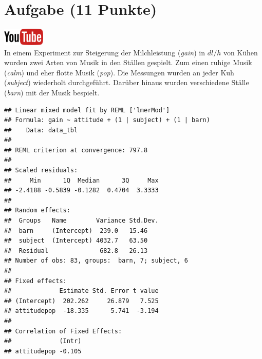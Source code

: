 \documentclass[a4paper, 10pt]{scrartcl}\usepackage[]{graphicx}\usepackage[]{xcolor}
\makeatletter
\newenvironment{kframe}{%
 \def\at@end@of@kframe{}%
 \ifinner\ifhmode%
  \def\at@end@of@kframe{\end{minipage}}%
  \begin{minipage}{\columnwidth}%
 \fi\fi%
 \def\FrameCommand##1{\hskip\@totalleftmargin \hskip-\fboxsep
 \colorbox{shadecolor}{##1}\hskip-\fboxsep
     \hskip-\linewidth \hskip-\@totalleftmargin \hskip\columnwidth}%
 \MakeFramed {\advance\hsize-\width
   \@totalleftmargin\z@ \linewidth\hsize
   \@setminipage}}%
 {\par\unskip\endMakeFramed%
 \at@end@of@kframe}
\newenvironment{knitrout}{}{} %
\makeatother
\begin{document}
\clearpage

\section{Aufgabe \hfill (11 Punkte)}

\hfill\href{https://youtu.be/ysai7umvPoA}{\includegraphics[width =
  2cm]{img/youtube}}\\[1Ex]


In einem Experiment zur Steigerung der Milchleistung (\textit{gain}) in $dl/h$ von
K{\"u}hen wurden zwei Arten von Musik in den St{\"a}llen gespielt. Zum einen ruhige
Musik (\textit{calm}) und eher flotte Musik (\textit{pop}). Die Messungen
wurden an jeder Kuh (\textit{subject}) wiederholt durchgef{\"u}hrt. Dar{\"u}ber
hinaus wurden verschiedene St{\"a}lle (\textit{barn}) mit der Musik bespielt.

\begin{knitrout}
\color{fgcolor}\begin{kframe}
\begin{verbatim}
## Linear mixed model fit by REML ['lmerMod']
## Formula: gain ~ attitude + (1 | subject) + (1 | barn)
##    Data: data_tbl
## 
## REML criterion at convergence: 797.8
## 
## Scaled residuals: 
##     Min      1Q  Median      3Q     Max 
## -2.4188 -0.5839 -0.1282  0.4704  3.3333 
## 
## Random effects:
##  Groups   Name        Variance Std.Dev.
##  barn     (Intercept)  239.0   15.46   
##  subject  (Intercept) 4032.7   63.50   
##  Residual              682.8   26.13   
## Number of obs: 83, groups:  barn, 7; subject, 6
## 
## Fixed effects:
##             Estimate Std. Error t value
## (Intercept)  202.262     26.879   7.525
## attitudepop  -18.335      5.741  -3.194
## 
## Correlation of Fixed Effects:
##             (Intr)
## attitudepop -0.105
\end{verbatim}
\end{kframe}
\end{knitrout}
\end{document}
